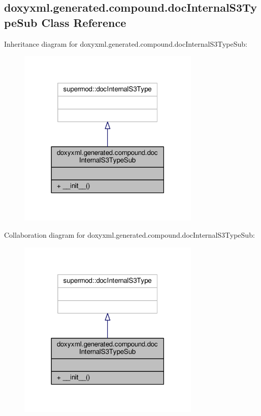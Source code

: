 \subsection{doxyxml.\+generated.\+compound.\+doc\+Internal\+S3\+Type\+Sub Class Reference}
\label{classdoxyxml_1_1generated_1_1compound_1_1docInternalS3TypeSub}


Inheritance diagram for doxyxml.\+generated.\+compound.\+doc\+Internal\+S3\+Type\+Sub\+:
\nopagebreak
\begin{figure}[H]
\begin{center}
\leavevmode
\includegraphics[width=246pt]{dc/df0/classdoxyxml_1_1generated_1_1compound_1_1docInternalS3TypeSub__inherit__graph}
\end{center}
\end{figure}


Collaboration diagram for doxyxml.\+generated.\+compound.\+doc\+Internal\+S3\+Type\+Sub\+:
\nopagebreak
\begin{figure}[H]
\begin{center}
\leavevmode
\includegraphics[width=246pt]{d9/d21/classdoxyxml_1_1generated_1_1compound_1_1docInternalS3TypeSub__coll__graph}
\end{center}
\end{figure}
